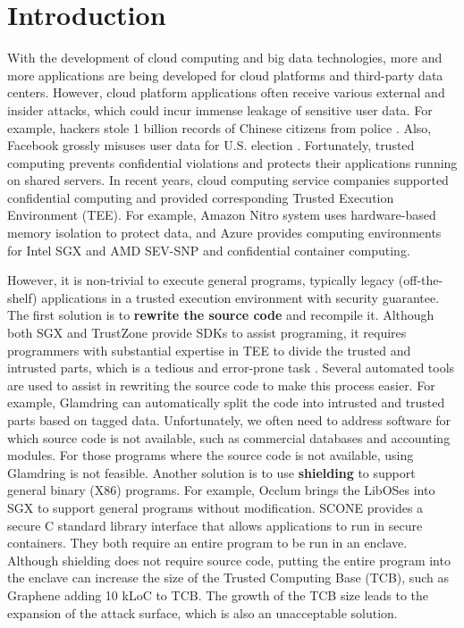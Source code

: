 \section{Introduction}
With the development of cloud computing and big data technologies,
more and more applications are being developed for cloud platforms
and third-party data centers. However, cloud platform applications
often receive various external and insider attacks, which could
incur immense leakage of sensitive user data.
For example, hackers stole 1 billion records of Chinese citizens from police \cite{ChinaHackPolice}.
Also, Facebook grossly misuses user data for U.S. election \cite{Facebook}.
Fortunately, trusted computing prevents confidential violations and
protects their applications running on shared servers.
In recent years, cloud computing service companies supported confidential
computing and provided corresponding Trusted Execution Environment (TEE).
For example, Amazon Nitro system \cite{AmazonNitro} uses hardware-based memory
isolation to protect data, and Azure \cite{AzureDocs} provides computing environments
for Intel SGX and AMD SEV-SNP and confidential container computing.

However, it is non-trivial to execute general programs, typically legacy (off-the-shelf)
applications in a trusted execution environment with security guarantee.
The first solution is to \textbf{rewrite the source code} and recompile it.
Although both SGX and TrustZone provide SDKs to assist programing, it requires
programmers with substantial expertise in TEE to divide the trusted and intrusted parts,
which is a tedious and error-prone task \cite{dong2021research}. Several automated tools
are used to assist in rewriting the source code to make this process easier.
For example, Glamdring \cite{Lind2017GlamdringAA} can automatically
split the code into intrusted and trusted parts based on tagged data.
Unfortunately, we often need to address software for which source code is not available,
such as commercial databases and accounting modules. For those programs where the
source code is not available, using Glamdring is not feasible.
Another solution is to use \textbf{shielding} to support general binary (X86) programs.
For example, Occlum \cite{Shen2020OcclumSA} brings the LibOSes
into SGX to support general programs without modification. SCONE \cite{Arnautov2016SCONESL}
provides a secure C standard library interface that allows applications to
run in secure containers. They both require an entire program to be run in an enclave.
Although shielding does not require source code,
putting the entire program into the enclave can increase the size of the
Trusted Computing Base (TCB), such as Graphene \cite{Tsai2017GrapheneSGXAP}
adding 10 kLoC to TCB.
The growth of the TCB size leads to the expansion of the attack surface,
which is also an unacceptable solution.

